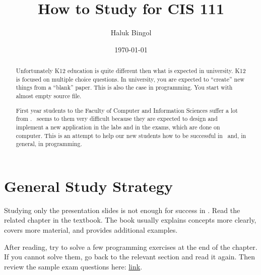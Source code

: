 \documentclass[%
 reprint,
 amsmath,amssymb,
 aps,
]{revtex4-2}
\begin{document}
\title{How to Study for CIS 111}
\author{
	Haluk Bingol
}
\date{\today}%

\begin{abstract}
	Unfortunately K12 education is quite different then what is expected in university.
	K12 is focused on multiple choice questions.
	In university, you are expected to ``create'' new things from a ``blank'' paper.
	This is also the case in programming.
	You start with almost empty source file.
	
	First year students to the Faculty of Computer and Information Sciences suffer a lot from \cisOOO.
	\cisOOO\ seems to them very difficult because they are expected to design and implement a new application in the labs and in the exams,
	which are done on computer.
	This is an attempt to help our new students how to be successful in \cisOOO\ and, 
	in general, 
	in programming.	
\end{abstract}

\maketitle

\tableofcontents








\section{General Study Strategy}

Studying only the presentation slides is not enough for success in \cisOOO. 
Read the related chapter in the textbook. 
The book usually explains concepts more clearly, covers more material, and 
provides additional examples.

After reading, try to solve a few programming exercises at the end of the chapter. 
If you cannot solve them, go back to the relevant section and read it again. 
Then review the sample exam questions here:
\href{https://drive.google.com/drive/folders/1r1TcJdlwSAhWCe9vA9BqdJSkVTFXkmkM?usp=drive_link}
	{link}.
\end{document}
